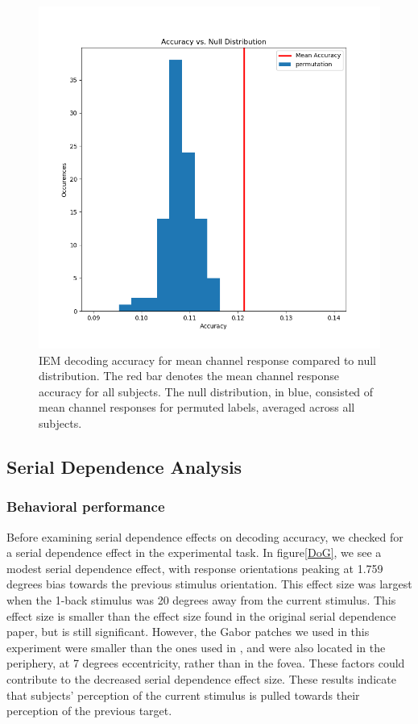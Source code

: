 \documentclass[../main.tex]{subfiles}
\begin{document}
\begin{figure}
    \centering
    \includegraphics[scale=0.7]{figures/results/null_comparison.png}
    \caption{IEM decoding accuracy for mean channel response compared to null distribution. The red bar denotes the mean channel response accuracy for all subjects. The null distribution, in blue, consisted of mean channel responses for permuted labels, averaged across all subjects.}
    \label{null_comparison}
\end{figure}

\subsection{Serial Dependence Analysis}
\subsubsection{Behavioral performance}
Before examining serial dependence effects on decoding accuracy, we checked for a serial dependence effect in the experimental task. In figure\ref{DoG}, we see a modest serial dependence effect, with response orientations peaking at 1.759 degrees bias towards the previous stimulus orientation. This effect size was largest when the 1-back stimulus was 20 degrees away from the current stimulus. This effect size is smaller than the effect size found in the original \cite{fischer_whitney_2014} serial dependence paper, but is still significant. However, the Gabor patches we used in this experiment were smaller than the ones used in \cite{fischer_whitney_2014}, and were also located in the periphery, at 7 degrees eccentricity, rather than in the fovea. These factors could contribute to the decreased serial dependence effect size. These results indicate that subjects' perception of the current stimulus is pulled towards their perception of the previous target.
\end{document}
